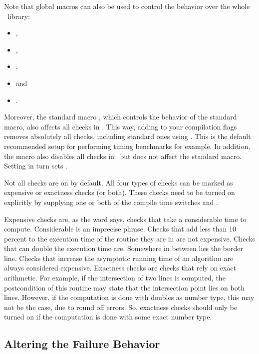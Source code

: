 Note that global macros can also be used to control the behavior over the
whole \cgal\ library:
\begin{itemize}
  \item {},
  \item {},
  \item {},
  \item {} and
  \item {}.
\end{itemize}

Moreover, the standard macro , which controls the behavior of
the standard  macro, also affects all checks in \cgal.  This way,
adding  to your compilation flags removes absolutely all
checks, including standard ones using .  This is the default
recommended setup for performing timing benchmarks for example.  In addition,
the macro  also disables all checks in \cgal\ but does
not affect the standard  macro.
Setting  in turn sets .

Not all checks are on by default.
All four types of checks can be marked as expensive or exactness checks
(or both).
These checks need to be turned on explicitly by supplying one or both of
the compile time switches  and 
.

Expensive checks are, as the word says, checks that take a considerable
time to compute. 
Considerable is an imprecise phrase. 
Checks that add less than 10 percent to the execution time of the routine 
they are in are not expensive.
Checks that can double the execution time are. 
Somewhere in between lies the border line.
Checks that increase the asymptotic running time of an algorithm are always 
considered expensive.
Exactness checks are checks that rely on exact arithmetic. 
For example, if the intersection of two lines is computed, the postcondition 
of this routine may state that the intersection point lies on both lines. 
However, if the computation is done with doubles as number type, this may not 
be the case, due to round off errors. 
So, exactness checks should only be turned on if the computation is done 
with some exact number type.

\subsection{Altering the Failure Behavior}

